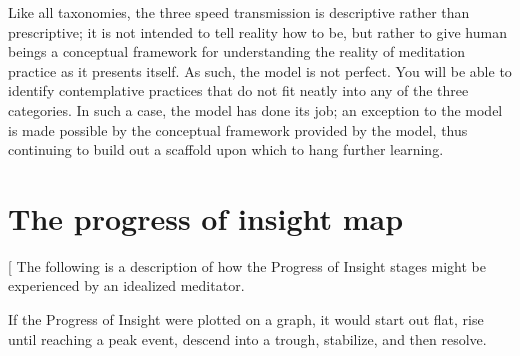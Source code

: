 \documentclass[a5paper,10pt,english]{book}
\begin{document}
\sphinxAtStartPar
Like all taxonomies, the three speed transmission is descriptive rather
than prescriptive; it is not intended to tell reality how to be, but
rather to give human beings a conceptual framework for understanding the
reality of meditation practice as it presents itself. As such, the model
is not perfect. You will be able to identify contemplative practices
that do not fit neatly into any of the three categories. In such a case,
the model has done its job; an exception to the model is made possible
by the conceptual framework provided by the model, thus continuing to
build out a scaffold upon which to hang further learning.


\section{The progress of insight map}
\label{\detokenize{main-2:the-progress-of-insight-map}}
\sphinxAtStartPar
{[}\sphinxstyleemphasis{Editor’s note: Introduce and define the Progress of Insight Map before
describing it in detail.}{]} The following is a description of how the
Progress of Insight stages might be experienced by an idealized
meditator.

\sphinxAtStartPar
If the Progress of Insight were plotted on a graph, it would start out
flat, rise until reaching a peak event, descend into a trough,
stabilize, and then resolve.
\end{document}

